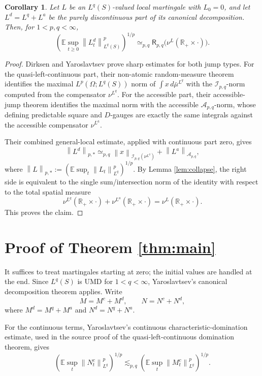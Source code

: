 \documentclass[11pt]{article}
\newtheorem{corollary}{Corollary}
\newcommand{\E}{\mathbb E}
\newcommand{\R}{\mathbb R}
\newcommand{\cI}{\mathcal I}
\newcommand{\cA}{\mathcal A}
\newcommand{\norm}[1]{\left\lVert #1\right\rVert}
\newcommand{\lesssimc}{\lesssim_{p,q}}
\newcommand{\simeqc}{\simeq_{p,q}}
\begin{document}
\begin{corollary}\label{cor:jumpnorm}
Let \(L\) be an \(L^q(S)\)-valued local martingale with \(L_0=0\), and let
\(L^d=L^q+L^a\) be the purely discontinuous part of its canonical
decomposition.  Then, for \(1<p,q<\infty\),
\[
   \left(\E\sup_{t\ge0}\norm{L^d_t}_{L^q(S)}^p\right)^{1/p}
   \simeqc
   \mathsf R_{p,q}\bigl(\nu^L(\R_+\times\cdot)\bigr).
\]
\end{corollary}

\begin{proof}
Dirksen and Yaroslavtsev prove sharp estimates for both jump types.  For the
quasi-left-continuous part, their non-atomic random-measure theorem identifies
the maximal \(L^p(\Omega;L^q(S))\) norm of
\(\int x\,d\bar\mu^{L^q}\) with the \(\cI_{p,q}\)-norm computed from the
compensator \(\nu^{L^q}\).  For the accessible part, their accessible-jump
theorem identifies the maximal norm with the accessible \(\cA_{p,q}\)-norm,
whose defining predictable square and \(D\)-gauges are exactly the same
integrals against the accessible compensator \(\nu^{L^a}\).

Their combined general-local estimate, applied with continuous part zero, gives
\[
   \norm{L^d}_{p,*}
   \simeqc
   \norm{x}_{\cI_{p,q}(\nu^{L^q})}
   +
   \norm{L^a}_{\cA_{p,q}},
\]
where \(\norm{L}_{p,*}:=(\E\sup_t\norm{L_t}_{L^q}^p)^{1/p}\).  By Lemma
\ref{lem:collapse}, the right side is equivalent to the single
sum/intersection norm of the identity with respect to the total spatial
measure
\[
  \nu^{L^q}(\R_+\times\cdot)+\nu^{L^a}(\R_+\times\cdot)
  =
  \nu^L(\R_+\times\cdot).
\]
This proves the claim.
\end{proof}

\section*{Proof of Theorem \ref{thm:main}}

It suffices to treat martingales starting at zero; the initial values are
handled at the end.  Since \(L^q(S)\) is UMD for \(1<q<\infty\), Yaroslavtsev's
canonical decomposition theorem \cite[Theorem 3.5]{Yaroslavtsev2019} applies.
Write
\[
   M=M^c+M^d,\qquad N=N^c+N^d,
\]
where \(M^d=M^q+M^a\) and \(N^d=N^q+N^a\).

For the continuous terms, Yaroslavtsev's continuous characteristic-domination
estimate, used in the source proof of the quasi-left-continuous domination
theorem, gives
\[
   \left(\E\sup_t\norm{N^c_t}_{L^q}^p\right)^{1/p}
   \lesssimc
   \left(\E\sup_t\norm{M^c_t}_{L^q}^p\right)^{1/p}.
\]
\end{document}
